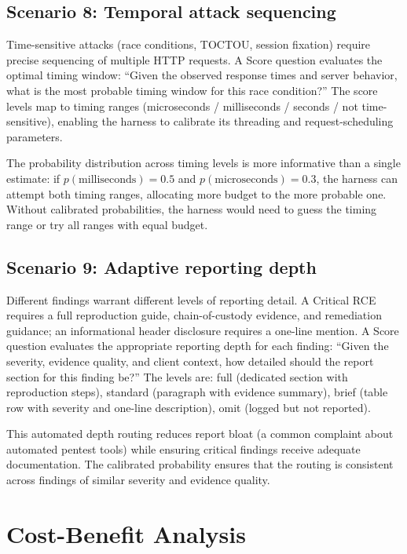 \documentclass[conference]{IEEEtran}
\begin{document}
\subsection{Scenario 8: Temporal attack sequencing}

Time-sensitive attacks (race conditions, TOCTOU, session fixation) require precise sequencing of multiple HTTP requests. A Score question evaluates the optimal timing window: ``Given the observed response times and server behavior, what is the most probable timing window for this race condition?'' The score levels map to timing ranges (microseconds / milliseconds / seconds / not time-sensitive), enabling the harness to calibrate its threading and request-scheduling parameters.

The probability distribution across timing levels is more informative than a single estimate: if $p(\text{milliseconds}) = 0.5$ and $p(\text{microseconds}) = 0.3$, the harness can attempt both timing ranges, allocating more budget to the more probable one. Without calibrated probabilities, the harness would need to guess the timing range or try all ranges with equal budget.

\subsection{Scenario 9: Adaptive reporting depth}

Different findings warrant different levels of reporting detail. A Critical RCE requires a full reproduction guide, chain-of-custody evidence, and remediation guidance; an informational header disclosure requires a one-line mention. A Score question evaluates the appropriate reporting depth for each finding: ``Given the severity, evidence quality, and client context, how detailed should the report section for this finding be?'' The levels are: \textsf{full} (dedicated section with reproduction steps), \textsf{standard} (paragraph with evidence summary), \textsf{brief} (table row with severity and one-line description), \textsf{omit} (logged but not reported).

This automated depth routing reduces report bloat (a common complaint about automated pentest tools) while ensuring critical findings receive adequate documentation. The calibrated probability ensures that the routing is consistent across findings of similar severity and evidence quality.

\section{Cost-Benefit Analysis}\label{sec:cost}
\end{document}
